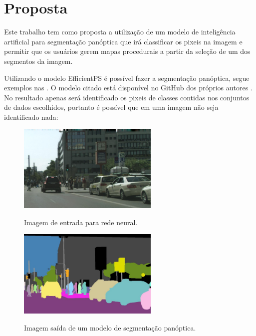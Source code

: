 \section{Proposta}

Este trabalho tem como proposta a utilização de um modelo de inteligência artificial para segmentação panóptica que irá classificar os pixeis na imagem e permitir que os usuários gerem mapas procedurais a partir da seleção de um dos segmentos da imagem.

Utilizando o modelo EfficientPS é possível fazer a segmentação panóptica, segue exemplos nas . O modelo citado está disponível no GitHub dos próprios autores .
No resultado apenas será identificado os pixeis de classes contidas nos conjuntos de dados escolhidos, portanto é possível que em uma imagem não seja identificado nada:

\begin{figure}[!ht]
	\centering
    \caption{Imagem de entrada para rede neural.}
	\includegraphics[width=0.6\textwidth]{figures/segmantations_1.png}
	\label{fig:segmantations_1}
\end{figure}

\begin{figure}[!ht]
	\centering
    \caption{Imagem saída de um modelo de segmentação panóptica.}
	\includegraphics[width=0.6\textwidth]{figures/segmantations_2.png}
	\label{fig:segmantations_2}
\end{figure}

